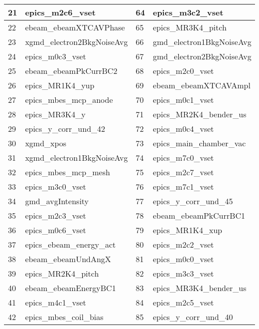 \begin{table}[!ht]
\begin{tabular}{|l|l|l|l|}
        21 &  epics\_m2c6\_vset & 64 &  epics\_m3c2\_vset \\ \hline
        22 &  ebeam\_ebeamXTCAVPhase & 65 &  epics\_MR3K4\_pitch \\ \hline
        23 &  xgmd\_electron2BkgNoiseAvg & 66 &  gmd\_electron1BkgNoiseAvg \\ \hline
        24 &  epics\_m0c3\_vset & 67 &  gmd\_electron2BkgNoiseAvg \\ \hline
        25 &  ebeam\_ebeamPkCurrBC2 & 68 &  epics\_m2c0\_vset \\ \hline
        26 &  epics\_MR1K4\_yup & 69 &  ebeam\_ebeamXTCAVAmpl \\ \hline
        27 &  epics\_mbes\_mcp\_anode & 70 &  epics\_m0c1\_vset \\ \hline
        28 &  epics\_MR3K4\_y & 71 &  epics\_MR2K4\_bender\_us \\ \hline
        29 &  epics\_y\_corr\_und\_42 & 72 &  epics\_m0c4\_vset \\ \hline
        30 &  xgmd\_xpos & 73 &  epics\_main\_chamber\_vac \\ \hline
        31 &  xgmd\_electron1BkgNoiseAvg & 74 &  epics\_m7c0\_vset \\ \hline
        32 &  epics\_mbes\_mcp\_mesh & 75 &  epics\_m2c7\_vset \\ \hline
        33 &  epics\_m3c0\_vset & 76 &  epics\_m7c1\_vset \\ \hline
        34 &  gmd\_avgIntensity & 77 &  epics\_y\_corr\_und\_45 \\ \hline
        35 &  epics\_m2c3\_vset & 78 &  ebeam\_ebeamPkCurrBC1 \\ \hline
        36 &  epics\_m0c6\_vset & 79 &  epics\_MR1K4\_xup \\ \hline
        37 &  epics\_ebeam\_energy\_act & 80 &  epics\_m2c2\_vset \\ \hline
        38 &  ebeam\_ebeamUndAngX & 81 &  epics\_m0c0\_vset \\ \hline
        39 &  epics\_MR2K4\_pitch & 82 &  epics\_m3c3\_vset \\ \hline
        40 &  ebeam\_ebeamEnergyBC1 & 83 &  epics\_MR3K4\_bender\_us \\ \hline
        41 &  epics\_m4c1\_vset & 84 &  epics\_m2c5\_vset \\ \hline
        42 &  epics\_mbes\_coil\_bias & 85 &  epics\_y\_corr\_und\_40 \\ \hline
    \end{tabular}
\end{table}